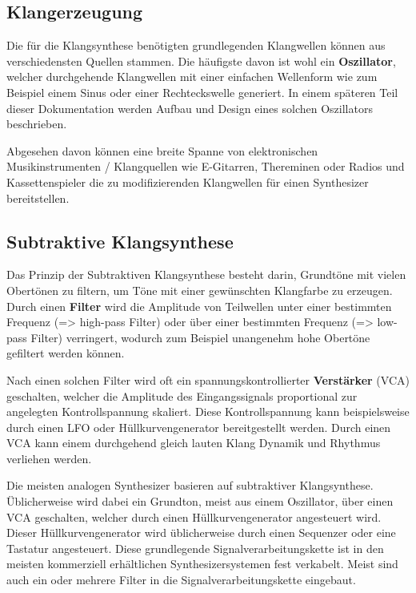 \subsection{Klangerzeugung}
\label{sec:org6b111d9}
Die für die Klangsynthese benötigten grundlegenden Klangwellen können aus verschiedensten Quellen stammen. Die häufigste davon ist wohl ein \textbf{Oszillator}, welcher durchgehende Klangwellen mit einer einfachen Wellenform wie zum Beispiel einem Sinus oder einer Rechteckswelle generiert. In einem späteren Teil dieser Dokumentation werden Aufbau und Design eines solchen Oszillators beschrieben.

Abgesehen davon können eine breite Spanne von elektronischen Musikinstrumenten / Klangquellen wie E-Gitarren, Thereminen oder Radios und Kassettenspieler die zu modifizierenden Klangwellen für einen Synthesizer bereitstellen.

\subsection{Subtraktive Klangsynthese}
\label{sec:org843de53}
Das Prinzip der Subtraktiven Klangsynthese besteht darin, Grundtöne mit vielen Obertönen zu filtern, um Töne mit einer gewünschten Klangfarbe zu erzeugen. Durch einen \textbf{Filter} wird die Amplitude von Teilwellen unter einer bestimmten Frequenz (=> high-pass Filter) oder über einer bestimmten Frequenz (=> low-pass Filter) verringert, wodurch zum Beispiel unangenehm hohe Obertöne gefiltert werden können.

Nach einen solchen Filter wird oft ein spannungskontrollierter \textbf{Verstärker} (VCA) geschalten, welcher die Amplitude des Eingangssignals proportional zur angelegten Kontrollspannung skaliert. Diese Kontrollspannung kann beispielsweise durch einen LFO oder Hüllkurvengenerator bereitgestellt werden. Durch einen VCA kann einem durchgehend gleich lauten Klang Dynamik und Rhythmus verliehen werden.

Die meisten analogen Synthesizer basieren auf subtraktiver Klangsynthese. Üblicherweise wird dabei ein Grundton, meist aus einem Oszillator, über einen VCA geschalten, welcher durch einen Hüllkurvengenerator angesteuert wird. Dieser Hüllkurvengenerator wird üblicherweise durch einen Sequenzer oder eine Tastatur angesteuert. Diese grundlegende Signalverarbeitungskette ist in den meisten kommerziell erhältlichen Synthesizersystemen fest verkabelt. Meist sind auch ein oder mehrere Filter in die Signalverarbeitungskette eingebaut.

